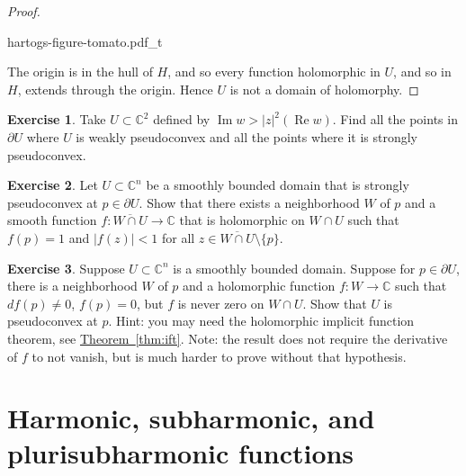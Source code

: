 \documentclass[12pt,openany]{book}
\renewcommand{\Re}{\operatorname{Re}}
\renewcommand{\Im}{\operatorname{Im}}
\newcommand{\sabs}[1]{\lvert {#1} \rvert}
\newcommand{\C}{{\mathbb{C}}}
\theoremstyle{plain}
\theoremstyle{remark}
\theoremstyle{definition}
\newenvironment{exbox}{%
    \def\FrameCommand{\vrule width 1pt \relax\hspace {10pt}}%
    \MakeFramed {\advance \hsize -\width \FrameRestore }%
}{%
    \endMakeFramed
}
\theoremstyle{exercise}
\newtheorem{exercise}{Exercise}[section]
\theoremstyle{example}
\newcommand{\thmref}[1]{\hyperref[#1]{Theorem~\ref*{#1}}}
\begin{document}
\begin{proof}
\begin{center}
{hartogs-figure-tomato.pdf_t}
\end{center}

The origin is in the hull of $H$, and so
every function holomorphic in $U$, and so in $H$, extends through the origin.
Hence $U$ is not a domain of holomorphy.
\end{proof}

\begin{exbox}
\begin{exercise}
Take $U \subset \C^2$ defined by $\Im w > \sabs{z}^2(\Re w)$.  Find all the
points in $\partial U$ where $U$ is weakly pseudoconvex and all the points
where it is strongly pseudoconvex.
\end{exercise}

\begin{exercise}
Let $U \subset \C^n$ be a smoothly bounded domain that is
strongly pseudoconvex at $p \in \partial U$.  Show that there
exists a neighborhood $W$ of $p$ and a smooth function $f \colon
\overline{W \cap U} \to \C$ that is holomorphic on $W \cap U$
such that $f(p)=1$ and $\sabs{f(z)} < 1$ for all
$z \in \overline{W \cap U} \setminus \{ p \}$.
\end{exercise}

\begin{exercise}
Suppose $U \subset \C^n$ is a smoothly bounded domain.  Suppose
for $p \in \partial U$, there is a neighborhood $W$ of $p$
and a holomorphic function $f \colon W \to
\C$ such that $df(p) \not= 0$, $f(p) = 0$, but
$f$ is never zero on $W \cap U$.  Show that $U$ is pseudoconvex
at $p$.  Hint: you may need the holomorphic implicit function theorem, see
\thmref{thm:ift}.
Note: the result does not require the derivative of $f$ to not vanish, but is
much harder to prove without that hypothesis.
\end{exercise}
\end{exbox}


\section{Harmonic, subharmonic, and plurisubharmonic functions}
\label{sec:harmonic}

\end{document}

